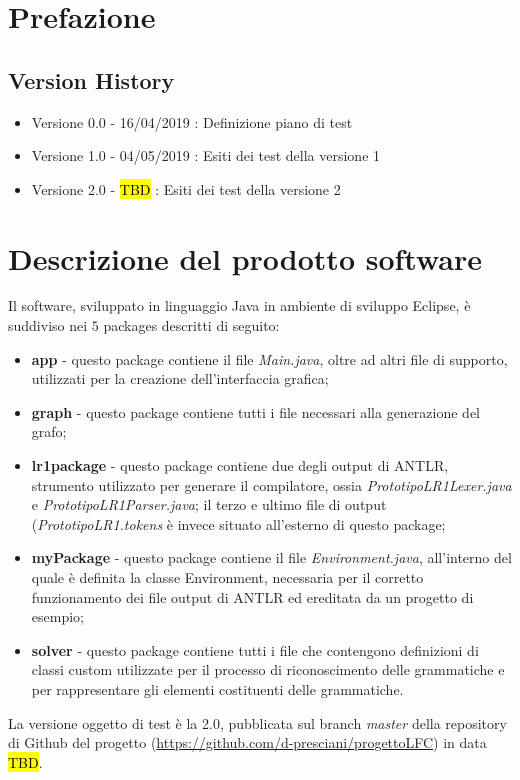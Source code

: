 \documentclass[12pt]{article}
\begin{document}
\tableofcontents

\pagebreak

\section{Prefazione}

\subsection{Version History}

\begin{itemize}
\item Versione 0.0 - 16/04/2019 : Definizione piano di test 
\item Versione 1.0 - 04/05/2019 : Esiti dei test della versione 1
\item Versione 2.0 - \hl{TBD} : Esiti dei test della versione 2
\end{itemize}

\pagebreak

\section{Descrizione del prodotto software}
Il software, sviluppato in linguaggio Java in ambiente di sviluppo Eclipse, è suddiviso nei $5$ packages descritti di seguito:
\begin{itemize}
\item \textbf{app} - questo package contiene il file \textit{Main.java}, oltre ad altri file di supporto, utilizzati per la creazione dell'interfaccia grafica;
\item \textbf{graph} - questo package contiene tutti i file necessari alla generazione del grafo;
\item \textbf{lr1package} - questo package contiene due degli output di ANTLR, strumento utilizzato per generare il compilatore, ossia \textit{PrototipoLR1Lexer.java} e \textit{PrototipoLR1Parser.java}; il terzo e ultimo file di output (\textit{PrototipoLR1.tokens} è invece situato all'esterno di questo package;
\item \textbf{myPackage} - questo package contiene il file \textit{Environment.java}, all'interno del quale è definita la classe Environment, necessaria per il corretto funzionamento dei file output di ANTLR ed ereditata da un progetto di esempio;
\item \textbf{solver} - questo package contiene tutti i file che contengono definizioni di classi custom utilizzate per il processo di riconoscimento delle grammatiche e per rappresentare gli elementi costituenti delle grammatiche.
\end{itemize}
La versione oggetto di test è la 2.0, pubblicata sul branch \textit{master} della repository di Github del progetto (\url{https://github.com/d-presciani/progettoLFC}) in data \hl{TBD}.
\pagebreak
\end{document}
